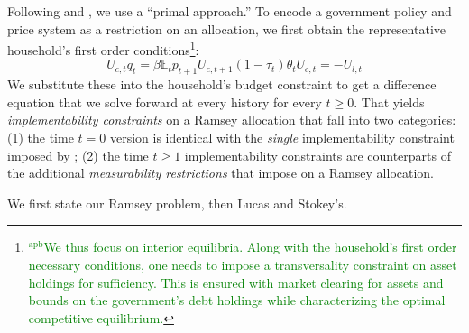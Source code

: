 \documentclass[12pt]{article}
\newcommand{\apb}[1]{\textcolor{green}{$^{\textrm{apb}}${#1}}}
\newcommand{\EE}{\mathbb E}
\begin{document}
Following \citet{LucasJr.1983}
and
\citet{Aiyagari2002}, we use a
``primal approach.''   To encode a  government policy and price system as a restriction on an allocation,
we  first obtain   the representative household's first order conditions\footnote{\apb{We thus focus on interior equilibria. Along with the household's first order necessary conditions, one needs to impose a transversality constraint on asset holdings for sufficiency. This is ensured with market clearing for assets and bounds on the government's debt holdings while characterizing the optimal competitive equilibrium.}}:
\begin{subequations}
	\begin{equation}
	\label{eqn:Euler}
		U_{c,t} q_t = \beta \EE_t p_{t+1}U_{c,t+1} 
	\end{equation}
	\begin{equation}
		(1-\tau_t)\theta_tU_{c,t} = - U_{l,t} 
	\end{equation}


\end{subequations}
We substitute these into the household's budget constraint to get a difference equation that we  solve forward   at every history for every $t \geq 0$.
That yields \textit{implementability constraints} on a Ramsey allocation that fall into two categories: (1) the time $t=0$ version is identical
with the {\em single} implementability constraint imposed by \citet{LucasJr.1983}; (2) the time $t \geq 1$ implementability constraints
are counterparts  of the additional
 \emph{measurability restrictions} that \citet{Aiyagari2002} impose on  a Ramsey allocation.
%





%
%
%
%
%
We first state our Ramsey problem, then Lucas and Stokey's.
\end{document}
